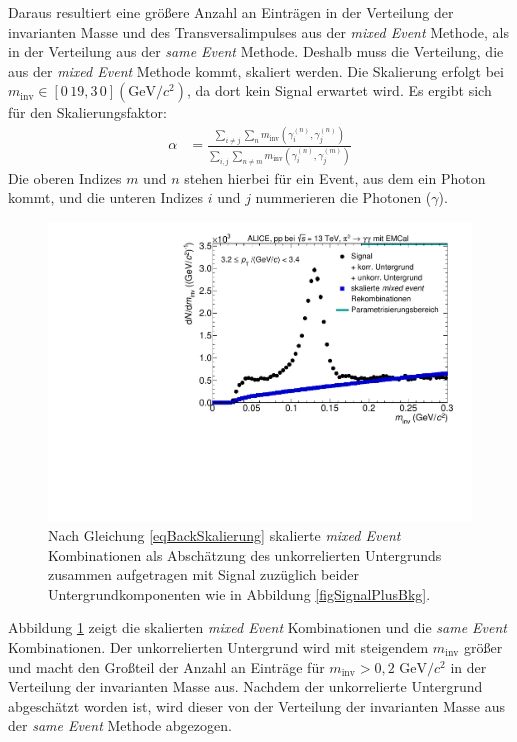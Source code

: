 Daraus resultiert eine größere Anzahl an Einträgen in der Verteilung der invarianten Masse und des Transversalimpulses aus der \textit{mixed Event} Methode, als in der Verteilung aus der \textit{same Event} Methode.
Deshalb muss die Verteilung, die aus der \textit{mixed Event} Methode kommt, skaliert werden.
Die Skalierung erfolgt bei $m_\text{inv} \in \left[0\,19,3\,0\right] (\text{GeV/}c^{2})$, da dort kein Signal erwartet wird.
Es ergibt sich für den Skalierungsfaktor:
\begin{align}
\label{eqBackSkalierung}
\alpha &= \frac{\sum_{i \neq j}\sum_{n}m_{\text{inv}}\left( \gamma^{(n)}_{i},\gamma^{(n)}_{j}\right) }{\sum_{i,j}\sum_{n \neq m}m_{\text{inv}}\left( \gamma^{(n)}_{i},\gamma^{(m)}_{j}\right) }
\end{align}
Die oberen Indizes $m$ und $n$ stehen hierbei für ein Event, aus dem ein Photon kommt, und die unteren Indizes $i$ und $j$ nummerieren die Photonen ($\gamma$).
\begin{figure}[t!]
\centering
\includegraphics[width=.75\linewidth]{hUncorrBkgNorm.pdf}
\caption{Nach Gleichung \ref{eqBackSkalierung} skalierte {\it mixed Event} Kombinationen als Abschätzung des unkorrelierten Untergrunds zusammen aufgetragen mit Signal zuzüglich beider Untergrundkomponenten wie in Abbildung \ref{figSignalPlusBkg}.}
\label{figUncorrBkgNorm}
\end{figure}
\newline
Abbildung \ref{figUncorrBkgNorm} zeigt die skalierten \textit{mixed Event} Kombinationen und die \textit{same Event} Kombinationen.
Der unkorrelierten Untergrund wird mit steigendem $m_\text{inv}$ größer und macht den Großteil der Anzahl an Einträge für $m_\text{inv} > 0,2 \text{ GeV/}c^{2}$ in der Verteilung der invarianten Masse aus. 
Nachdem der unkorrelierte Untergrund abgeschätzt worden ist, wird dieser von der Verteilung der invarianten Masse aus der \textit{same Event} Methode abgezogen.
